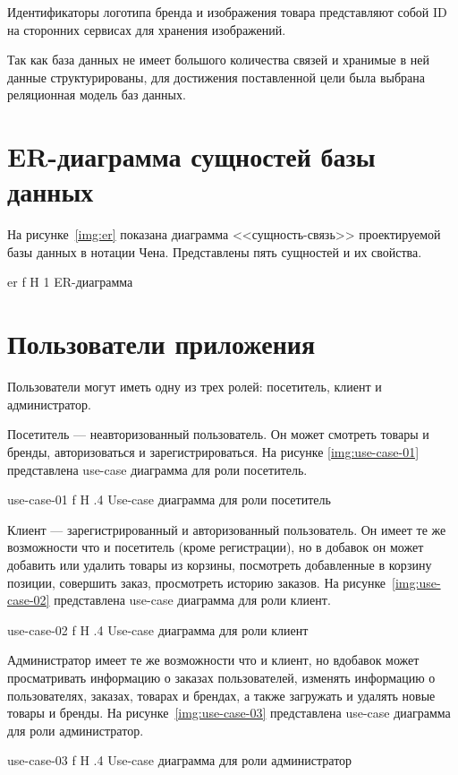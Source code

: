 \documentclass{bmstu}
\begin{document}
Идентификаторы логотипа бренда и изображения товара представляют собой ID на сторонних сервисах для хранения изображений.

Так как база данных не имеет большого количества связей и хранимые в ней данные структурированы, для достижения поставленной цели была выбрана реляционная модель баз данных.

\section{ER-диаграмма сущностей базы данных}

На рисунке~\ref{img:er} показана диаграмма <<сущность-связь>> проектируемой базы данных в нотации Чена. 
Представлены пять сущностей и их свойства.

    {er}
    {f}
    {H}
    {1\textwidth}
    {ER-диаграмма}
    
\section{Пользователи приложения}

Пользователи могут иметь одну из трех ролей: посетитель, клиент и администратор.

Посетитель --- неавторизованный пользователь. 
Он может смотреть товары и бренды, авторизоваться и зарегистрироваться. На рисунке \ref{img:use-case-01} представлена use-case диаграмма для роли посетитель.

{use-case-01}
{f}
{H}
{.4\textwidth}
{Use-case диаграмма для роли посетитель}

Клиент --- зарегистрированный и авторизованный пользователь. 
Он имеет те же возможности что и посетитель (кроме регистрации), но в добавок он может добавить или удалить товары из корзины, посмотреть добавленные в корзину позиции, совершить заказ, просмотреть историю заказов. На рисунке~\ref{img:use-case-02} представлена use-case диаграмма для роли клиент.

{use-case-02}
{f}
{H}
{.4\textwidth}
{Use-case диаграмма для роли клиент}

Администратор имеет те же возможности что и клиент, но вдобавок может просматривать информацию о заказах пользователей, изменять информацию о пользователях, заказах, товарах и брендах, а также загружать и удалять новые товары и бренды. На рисунке~\ref{img:use-case-03} представлена use-case диаграмма для роли администратор.

{use-case-03}
{f}
{H}
{.4\textwidth}
{Use-case диаграмма для роли администратор}
\end{document}
